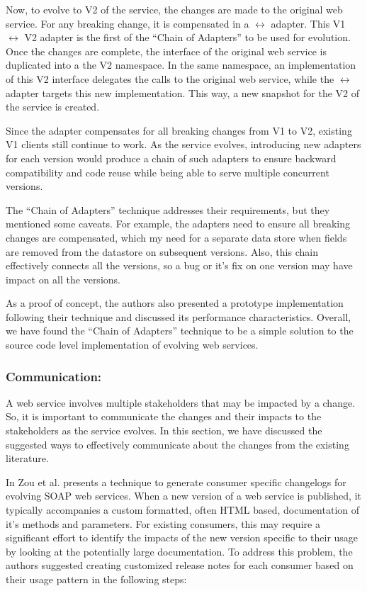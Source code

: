 \documentclass[runningheads,a4paper]{llncs}
\begin{document}
Now, to evolve to V2 of the service, the changes are made to the original web service. For any breaking change, it is compensated in a $\leftrightarrow$ adapter. This V1 $\leftrightarrow$ V2 adapter is the first of the ``Chain of Adapters'' to be used for evolution. Once the changes are complete, the interface of the original web service is duplicated into a the V2 namespace. In the same namespace, an implementation of this V2 interface delegates the calls to the original web service, while the $\leftrightarrow$ adapter targets this new implementation. This way, a new snapshot for the V2 of the service is created.

Since the adapter compensates for all breaking changes from V1 to V2, existing V1 clients still continue to work. As the service evolves, introducing new adapters for each version would produce a chain of such adapters to ensure backward compatibility and code reuse while being able to serve multiple concurrent versions.

The ``Chain of Adapters'' technique addresses their requirements, but they mentioned some caveats. For example, the adapters need to ensure all breaking changes are compensated, which my need for a separate data store when fields are removed from the datastore on subsequent versions. Also, this chain effectively connects all the versions, so a bug or it’s fix on one version may have impact on all the versions.

As a proof of concept, the authors also presented a prototype implementation following their technique and discussed its performance characteristics. Overall, we have found the ``Chain of Adapters'' technique to be a simple solution to the source code level implementation of evolving web services.

\subsubsection{Communication:}
A web service involves multiple stakeholders that may be impacted by a change. So, it is important to communicate the changes and their impacts to the stakeholders as the service evolves. In this section, we have discussed the suggested ways to effectively communicate about the changes from the existing literature.

In \cite{le2008synchronizing} Zou et al. presents a technique to generate consumer specific changelogs for evolving SOAP web services. When a new version of a web service is published, it typically accompanies a custom formatted, often HTML based, documentation of it’s methods and parameters. For existing consumers, this may require a significant effort to identify the impacts of the new version specific to their usage by looking at the potentially large documentation. To address this problem, the authors suggested creating customized release notes for each consumer based on their usage pattern in the following steps:
\end{document}
